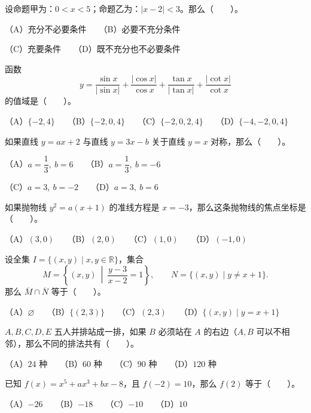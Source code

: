 \begin{question}
设命题甲为：$0<x<5$；命题乙为：$|x-2|<3$。那么\mbox{（　　）}。

（A）充分不必要条件　　（B）必要不充分条件

（C）充要条件　　（D）既不充分也不必要条件

\end{question}
\begin{question}
函数
\nopagebreak[4]
\[
y=\frac{\sin x}{|\sin x|}+\frac{|\cos x|}{\cos x}+\frac{\tan x}{|\tan x|}+\frac{|\cot x|}{\cot x}
\]
的值域是\mbox{（　　）}。

（A）$\{-2,4\}$　　（B）$\{-2,0,4\}$　　（C）$\{-2,0,2,4\}$　　（D）$\{-4,-2,0,4\}$

\end{question}
\begin{question}
如果直线 $y=ax+2$ 与直线 $y=3x-b$ 关于直线 $y=x$ 对称，那么\mbox{（　　）}。

（A）$a=\dfrac13,\ b=6$　　（B）$a=\dfrac13,\ b=-6$

（C）$a=3,\ b=-2$　　（D）$a=3,\ b=6$

\end{question}
\begin{question}
如果抛物线 $y^2=a(x+1)$ 的准线方程是 $x=-3$，那么这条抛物线的焦点坐标是\mbox{（　　）}。

（A）$(3,0)$　　（B）$(2,0)$　　（C）$(1,0)$　　（D）$(-1,0)$

\end{question}
\begin{question}
设全集 $I=\{(x,y)\mid x,y\in\mathbb R\}$，集合
\nopagebreak[4]
\[
M=\left\{(x,y)\ \middle|\ \frac{y-3}{x-2}=1\right\},\qquad
N=\{(x,y)\mid y\ne x+1\}.
\]
那么 $\overline M\cap\overline N$ 等于\mbox{（　　）}。

（A）$\varnothing$　　（B）$\{(2,3)\}$　　（C）$(2,3)$　　（D）$\{(x,y)\mid y=x+1\}$

\end{question}
\begin{question}
$A,B,C,D,E$ 五人并排站成一排，如果 $B$ 必须站在 $A$ 的右边（$A,B$ 可以不相邻），那么不同的排法共有\mbox{（　　）}。

（A）$24$ 种　　（B）$60$ 种　　（C）$90$ 种　　（D）$120$ 种

\end{question}
\begin{question}
已知 $f(x)=x^5+ax^3+bx-8$，且 $f(-2)=10$，那么 $f(2)$ 等于\mbox{（　　）}。

（A）$-26$　　（B）$-18$　　（C）$-10$　　（D）$10$

\Needspace{0.4\textheight}
\end{question}
